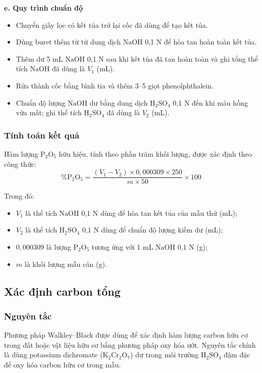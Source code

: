 \noindent\textbf{e. Quy trình chuẩn độ}
\begin{itemize}
  \item Chuyển giấy lọc có kết tủa trở lại cốc đã dùng để tạo kết tủa.
  \item Dùng buret thêm từ từ dung dịch \(\mathrm{NaOH}\) 0,1 N để hòa tan hoàn toàn kết tủa.
  \item Thêm dư 5 mL \(\mathrm{NaOH}\) 0,1 N sau khi kết tủa đã tan hoàn toàn và ghi tổng thể tích \(\mathrm{NaOH}\) đã dùng là $V_1$ (mL).
  \item Rửa thành cốc bằng bình tia và thêm 3--5 giọt phenolphthalein.
  \item Chuẩn độ lượng \(\mathrm{NaOH}\) dư bằng dung dịch \(\mathrm{H_2SO_4}\) 0,1 N đến khi màu hồng vừa mất; ghi thể tích \(\mathrm{H_2SO_4}\) đã dùng là $V_2$ (mL).
\end{itemize}

\subsubsection{Tính toán kết quả}
Hàm lượng \(\mathrm{P_2O_5}\) hữu hiệu, tính theo phần trăm khối lượng, được xác định theo công thức:
\[
  \%\mathrm{P_2O_5} = \frac{(V_1-V_2) \times 0{,}000309 \times 250}{m \times 50} \times 100
\]

Trong đó:
\begin{itemize}
  \item $V_1$ là thể tích \(\mathrm{NaOH}\) 0,1 N dùng để hòa tan kết tủa của mẫu thử (mL);
  \item $V_2$ là thể tích \(\mathrm{H_2SO_4}\) 0,1 N dùng để chuẩn độ lượng kiềm dư (mL);
  \item $0{,}000309$ là lượng \(\mathrm{P_2O_5}\) tương ứng với 1 mL \(\mathrm{NaOH}\) 0,1 N (g);
  \item $m$ là khối lượng mẫu cân (g).
\end{itemize}

\subsection{Xác định carbon tổng}
\subsubsection{Nguyên tắc}

Phương pháp Walkley--Black được dùng để xác định hàm lượng carbon hữu cơ trong đất hoặc vật liệu hữu cơ bằng phương pháp oxy hóa ướt. 
Nguyên tắc chính là dùng potassium dichromate (\(\mathrm{K_2Cr_2O_7}\)) dư trong môi trường \(\mathrm{H_2SO_4}\) đậm đặc để oxy hóa carbon hữu cơ trong mẫu.

